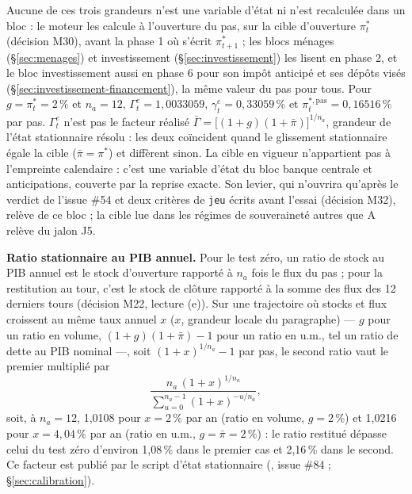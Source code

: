 \documentclass[11pt,a4paper]{article}
\newcommand{\code}[1]{\texttt{\detokenize{#1}}}
\begin{document}
\begin{proposee}
Aucune de ces trois grandeurs n'est une variable d'état ni n'est recalculée dans un bloc : le moteur les calcule à l'ouverture du pas, sur la cible d'ouverture $\pi^\ast_t$ (décision M30), avant la phase 1 où s'écrit $\pi^\ast_{t+1}$ ; les blocs ménages (\S\ref{sec:menages}) et investissement (\S\ref{sec:investissement}) les lisent en phase 2, et le bloc investissement aussi en phase 6 pour son impôt anticipé et ses dépôts visés (\S\ref{sec:investissement-financement}), la même valeur du pas pour tous. Pour $g = \pi^\ast_t = 2\,\%$ et $n_a = 12$, $\Gamma^e_t = 1{,}0033059$, $\gamma^e_t = 0{,}33059\,\%$ et $\pi^{\ast,\mathrm{pas}}_t = 0{,}16516\,\%$ par pas. $\Gamma^e_t$ n'est pas le facteur réalisé $\bar\Gamma = \bigl[(1 + g)(1 + \bar\pi)\bigr]^{1/n_a}$, grandeur de l'état stationnaire résolu : les deux coïncident quand le glissement stationnaire égale la cible ($\bar\pi = \pi^\ast$) et diffèrent sinon. La cible en vigueur n'appartient pas à l'empreinte calendaire : c'est une variable d'état du bloc banque centrale et anticipations, couverte par la reprise exacte. Son levier, qui n'ouvrira qu'après le verdict de l'issue \#54 et deux critères de \texttt{jeu} écrits avant l'essai (décision M32), relève de ce bloc ; la cible lue dans les régimes de souveraineté autres que A relève du jalon J5.

\textbf{Ratio stationnaire au PIB annuel.} Pour le test zéro, un ratio de stock au PIB annuel est le stock d'ouverture rapporté à $n_a$ fois le flux du pas ; pour la restitution au tour, c'est le stock de clôture rapporté à la somme des flux des 12 derniers tours (décision M22, lecture (e)). Sur une trajectoire où stocks et flux croissent au même taux annuel $x$ ($x$, grandeur locale du paragraphe) --- $g$ pour un ratio en volume, $(1 + g)(1 + \bar\pi) - 1$ pour un ratio en u.m., tel un ratio de dette au PIB nominal ---, soit $(1 + x)^{1/n_a} - 1$ par pas, le second ratio vaut le premier multiplié par
\begin{equation*}
\frac{n_a\,(1 + x)^{1/n_a}}{\sum_{u=0}^{n_a-1} (1 + x)^{-u/n_a}} ,
\end{equation*}
soit, à $n_a = 12$, 1,0108 pour $x = 2\,\%$ par an (ratio en volume, $g = 2\,\%$) et 1,0216 pour $x = 4{,}04\,\%$ par an (ratio en u.m., $g = \bar\pi = 2\,\%$) : le ratio restitué dépasse celui du test zéro d'environ 1,08\,\% dans le premier cas et 2,16\,\% dans le second. Ce facteur est publié par le script d'état stationnaire (\code{outils/etat_stationnaire.py}, issue \#84 ; \S\ref{sec:calibration}).
\end{proposee}
\end{document}
